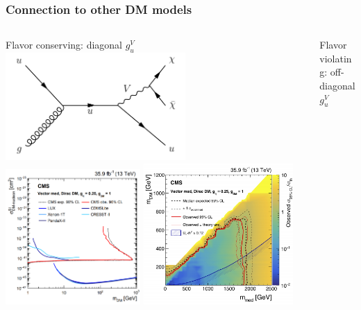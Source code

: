 \documentclass[aspectratio=169,xcolor=dvipsnames,,table,compress]{beamer}
\begin{document}
\begin{frame}[t] \frametitle{Connection to other DM models}
  \vspace{-5mm}
  \begin{columns}[T]
	\begin{column}{0.5\textwidth}
      \centering 
        Flavor conserving: diagonal $g_u^V$ \\ 
        \includegraphics[width=0.6\textwidth]{../figures/monotop/diagrams/mj.pdf} \\ 
        \includegraphics[width=0.45\textwidth]{../figures/talk/monojet.png}
        \includegraphics[width=0.5\textwidth]{../figures/talk/monojet2.png}
    \end{column}
	\begin{column}{0.5\textwidth}
      \centering 
        Flavor violating: off-diagonal $g_u^V$ \\ 

\end{column}
\end{columns}
\end{frame}
\end{document}
